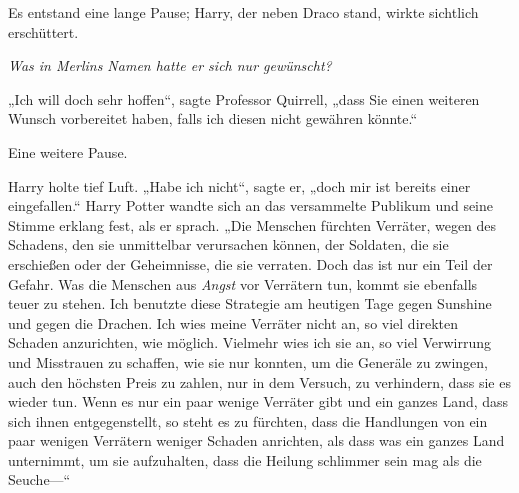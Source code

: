 Es entstand eine lange Pause; Harry, der neben Draco stand, wirkte sichtlich erschüttert.

\emph{Was in Merlins Namen hatte er sich nur gewünscht?}

„Ich will doch sehr hoffen“, sagte Professor Quirrell, „dass Sie einen weiteren Wunsch vorbereitet haben, falls ich diesen nicht gewähren könnte.“

Eine weitere Pause.

Harry holte tief Luft. „Habe ich nicht“, sagte er, „doch mir ist bereits einer eingefallen.“ Harry Potter wandte sich an das versammelte Publikum und seine Stimme erklang fest, als er sprach. „Die Menschen fürchten Verräter, wegen des Schadens, den sie unmittelbar verursachen können, der Soldaten, die sie erschießen oder der Geheimnisse, die sie verraten. Doch das ist nur ein Teil der Gefahr. Was die Menschen aus \emph{Angst} vor Verrätern tun, kommt sie ebenfalls teuer zu stehen. Ich benutzte diese Strategie am heutigen Tage gegen Sunshine und gegen die Drachen. Ich wies meine Verräter nicht an, so viel direkten Schaden anzurichten, wie möglich. Vielmehr wies ich sie an, so viel Verwirrung und Misstrauen zu schaffen, wie sie nur konnten, um die Generäle zu zwingen, auch den höchsten Preis zu zahlen, nur in dem Versuch, zu verhindern, dass sie es wieder tun. Wenn es nur ein paar wenige Verräter gibt und ein ganzes Land, dass sich ihnen entgegenstellt, so steht es zu fürchten, dass die Handlungen von ein paar wenigen Verrätern weniger Schaden anrichten, als dass was ein ganzes Land unternimmt, um sie aufzuhalten, dass die Heilung schlimmer sein mag als die Seuche—“

